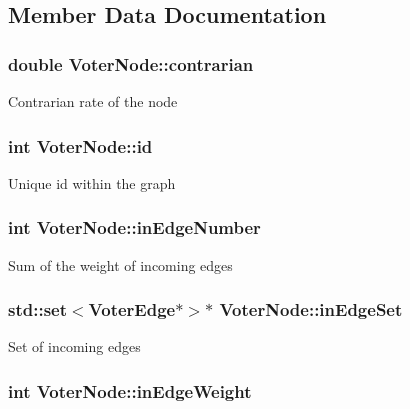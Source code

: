 \subsection{Member Data Documentation}
\hypertarget{class_voter_node_ae913afddad8f917f649e406fa1334b25}{
\subsubsection[{contrarian}]{\setlength{\rightskip}{0pt plus 5cm}double Voter\-Node\-::contrarian}}\label{class_voter_node_ae913afddad8f917f649e406fa1334b25}
Contrarian rate of the node \hypertarget{class_voter_node_a93568292fdcb41d849f54f586c598fbc}{
\subsubsection[{id}]{\setlength{\rightskip}{0pt plus 5cm}int Voter\-Node\-::id}}\label{class_voter_node_a93568292fdcb41d849f54f586c598fbc}
Unique id within the graph \hypertarget{class_voter_node_a9bd696aaa21ecf7b01bc877a6eaff534}{
\subsubsection[{in\-Edge\-Number}]{\setlength{\rightskip}{0pt plus 5cm}int Voter\-Node\-::in\-Edge\-Number}}\label{class_voter_node_a9bd696aaa21ecf7b01bc877a6eaff534}
Sum of the weight of incoming edges \hypertarget{class_voter_node_a753832f3c6b57995fce832169250a520}{
\subsubsection[{in\-Edge\-Set}]{\setlength{\rightskip}{0pt plus 5cm}std\-::set$<${\bf Voter\-Edge}$\ast$$>$$\ast$ Voter\-Node\-::in\-Edge\-Set}}\label{class_voter_node_a753832f3c6b57995fce832169250a520}
Set of incoming edges \hypertarget{class_voter_node_a630068d0551e05d9a7bf3eff1f3b1202}{
\subsubsection[{in\-Edge\-Weight}]{\setlength{\rightskip}{0pt plus 5cm}int Voter\-Node\-::in\-Edge\-Weight}}\label{class_voter_node_a630068d0551e05d9a7bf3eff1f3b1202}
